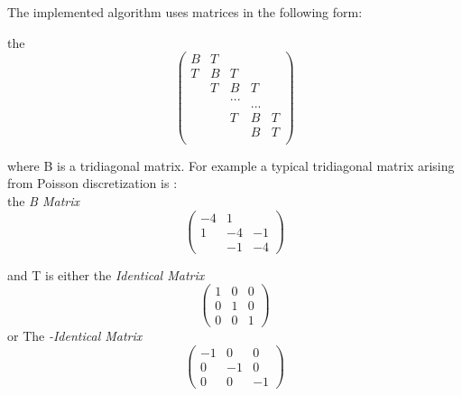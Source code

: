\chapter{}


The implemented algorithm uses matrices in the following form:

the \emph{ }
\[ \left( \begin{array}{ccccc}
B  & T &     &   &\\
T  & B &  T  &    &\\
   & T &  B  & T  &\\
   &   & ...    &    & \\
   &   &     & ...  &  \\
   &   &  T  & B & T \\    
   &   &     & B & T\\	
    \end{array} \right)\] 

where B is a tridiagonal matrix. For example a typical tridiagonal matrix arising from 
Poisson discretization is : \\
the \emph{B Matrix}
\[ \left( \begin{array}{ccc}
-4 & 1 &  \\
1  & -4 & -1 \\
   & -1 & -4 \end{array} \right)\] 
   
and T is either the \emph{Identical Matrix}
\[ \left( \begin{array}{ccc}
1 & 0 & 0 \\
0 & 1 & 0 \\
0 & 0 & 1 \end{array} \right)\] or The \emph{-Identical Matrix}
\[ \left( \begin{array}{ccc}
-1 & 0 & 0 \\
0 & -1 & 0 \\
0 & 0 & -1 \end{array} \right)\] 


